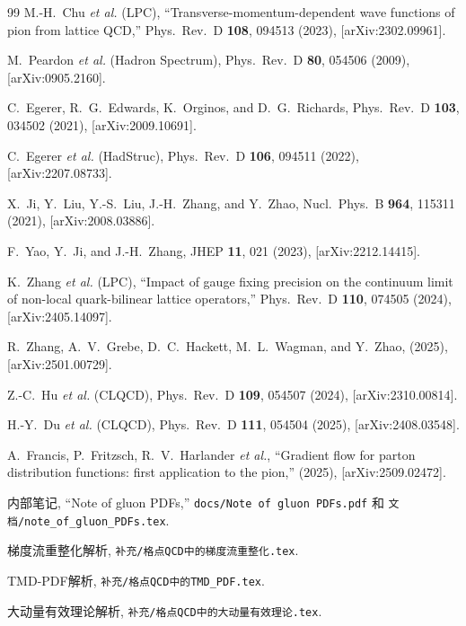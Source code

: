 \documentclass[12pt,a4paper]{ctexart}
\theoremstyle{definition}
\begin{document}
\begin{thebibliography}{99}
M.-H.~Chu \textit{et al.} (LPC),
``Transverse-momentum-dependent wave functions of pion from lattice QCD,''
Phys.\ Rev.\ D \textbf{108}, 094513 (2023), [arXiv:2302.09961].

M.~Peardon \textit{et al.} (Hadron Spectrum),
Phys.\ Rev.\ D \textbf{80}, 054506 (2009), [arXiv:0905.2160].

C.~Egerer, R.~G.~Edwards, K.~Orginos, and D.~G.~Richards,
Phys.\ Rev.\ D \textbf{103}, 034502 (2021), [arXiv:2009.10691].

C.~Egerer \textit{et al.} (HadStruc),
Phys.\ Rev.\ D \textbf{106}, 094511 (2022), [arXiv:2207.08733].

X.~Ji, Y.~Liu, Y.-S.~Liu, J.-H.~Zhang, and Y.~Zhao,
Nucl.\ Phys.\ B \textbf{964}, 115311 (2021), [arXiv:2008.03886].

F.~Yao, Y.~Ji, and J.-H.~Zhang,
JHEP \textbf{11}, 021 (2023), [arXiv:2212.14415].

K.~Zhang \textit{et al.} (LPC),
``Impact of gauge fixing precision on the continuum limit of non-local quark-bilinear lattice operators,''
Phys.\ Rev.\ D \textbf{110}, 074505 (2024), [arXiv:2405.14097].

R.~Zhang, A.~V.~Grebe, D.~C.~Hackett, M.~L.~Wagman, and Y.~Zhao,
(2025), [arXiv:2501.00729].

Z.-C.~Hu \textit{et al.} (CLQCD),
Phys.\ Rev.\ D \textbf{109}, 054507 (2024), [arXiv:2310.00814].

H.-Y.~Du \textit{et al.} (CLQCD),
Phys.\ Rev.\ D \textbf{111}, 054504 (2025), [arXiv:2408.03548].

A.~Francis, P.~Fritzsch, R.~V.~Harlander \textit{et al.},
``Gradient flow for parton distribution functions: first application to the pion,''
(2025), [arXiv:2509.02472].


内部笔记, ``Note of gluon PDFs,''
\texttt{docs/Note of gluon PDFs.pdf} 和 \texttt{文档/note\_of\_gluon\_PDFs.tex}.

梯度流重整化解析,
\texttt{补充/格点QCD中的梯度流重整化.tex}.

TMD-PDF解析,
\texttt{补充/格点QCD中的TMD\_PDF.tex}.

大动量有效理论解析,
\texttt{补充/格点QCD中的大动量有效理论.tex}.


\end{thebibliography}
\end{document}
